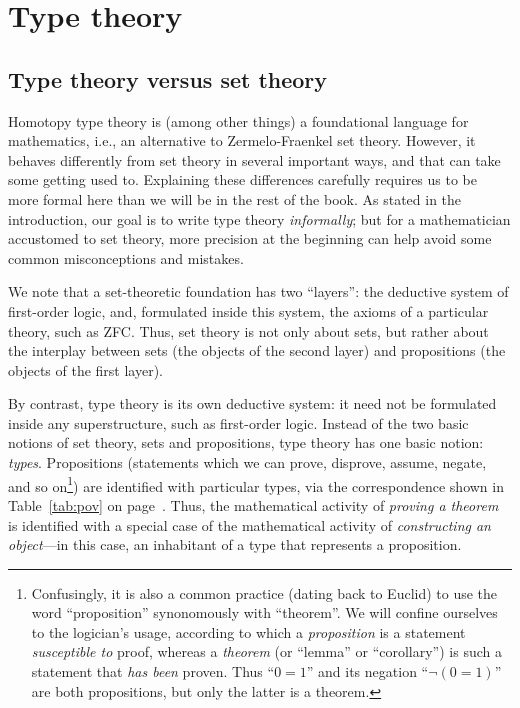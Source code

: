 \chapter{Type theory}
\label{cha:typetheory}

\section{Type theory versus set theory}
\label{sec:types-vs-sets}

Homotopy type theory is (among other things) a foundational language for mathematics, i.e., an alternative to Zermelo-Fraenkel set theory.
However, it behaves differently from set theory in several important ways, and that can take some getting used to.
Explaining these differences carefully requires us to be more formal here than we will be in the rest of the book.
As stated in the introduction, our goal is to write type theory \emph{informally}; but for a mathematician accustomed to set theory, more precision at the beginning can help avoid some common misconceptions and mistakes.

We note that a set-theoretic foundation has two ``layers'': the deductive system of first-order logic, and, formulated inside this system, the axioms of a particular theory, such as ZFC.
Thus, set theory is not only about sets, but rather about the interplay between sets (the objects of the second layer) and propositions (the objects of the first layer).

By contrast, type theory is its own deductive system: it need not be formulated inside any superstructure, such as first-order logic.
Instead of the two basic notions of set theory, sets and propositions, type theory has one basic notion: \emph{types}.
Propositions (statements which we can prove, disprove, assume, negate, and so on\footnote{Confusingly, it is also a common practice (dating back to Euclid) to use the word ``proposition'' synonomously with ``theorem''.
  We will confine ourselves to the logician's usage, according to which a \emph{proposition} is a statement \emph{susceptible to} proof, whereas a \emph{theorem} (or ``lemma'' or ``corollary'') is such a statement that \emph{has been} proven.
Thus ``$0=1$'' and its negation ``$\neg(0=1)$'' are both propositions, but only the latter is a theorem.}) are identified with particular types, via the correspondence shown in Table~\ref{tab:pov} on page~\pageref{tab:pov}.
Thus, the mathematical activity of \emph{proving a theorem} is identified with a special case of the mathematical activity of \emph{constructing an object}---in this case, an inhabitant of a type that represents a proposition.

